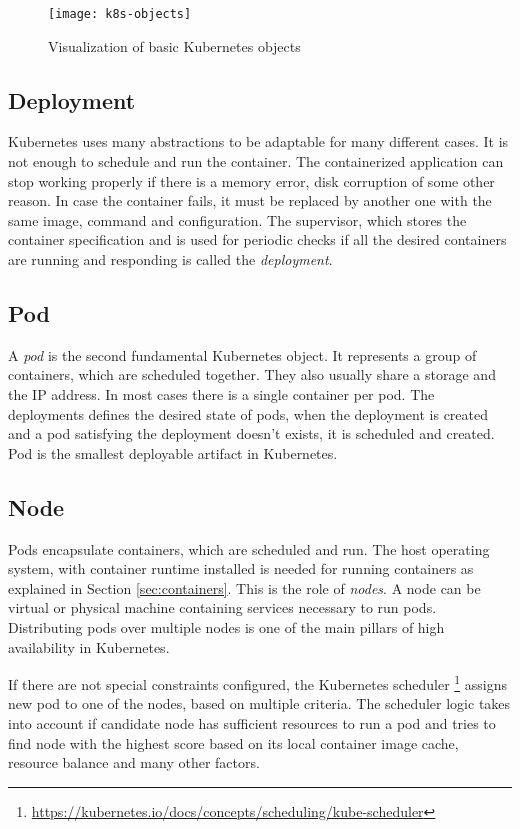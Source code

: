 \documentclass[
  digital, %
  twoside, %
  table,   %
  lof,     %
  lot,     %
]{fithesis3}
\begin{document}
\begin{figure}[H]
\caption{Visualization of basic Kubernetes objects}
\centering
\texttt{[image: k8s-objects]}
\label{fig:k8s_objects}
\end{figure}

\subsection{Deployment} \label{sec:deployment}
Kubernetes uses many abstractions to be adaptable for many different cases. It is not enough to schedule and run the container. The containerized application can stop working properly if there is a memory error, disk corruption of some other reason. In case the container fails, it must be replaced by another one with the same image, command and configuration. The supervisor, which stores the container specification and is used for periodic checks if all the desired containers are running and responding is called the \textit{deployment}.

\subsection{Pod} \label{sec:pod}
A \textit{pod} is the second fundamental Kubernetes object. It represents a group of containers, which are scheduled together. They also usually share a storage and the IP address. In most cases there is a single container per pod. The deployments defines the desired state of pods, when the deployment is created and a pod satisfying the deployment doesn't exists, it is scheduled and created. Pod is the smallest deployable artifact in Kubernetes.

\subsection{Node} \label{sec:node}
Pods encapsulate containers, which are scheduled and run. The host operating system, with container runtime installed is needed for running containers as explained in Section \ref{sec:containers}. This is the role of \textit{nodes}. A node can be virtual or physical machine containing services necessary to run pods. Distributing pods over multiple nodes is one of the main pillars of high availability in Kubernetes.

If there are not special constraints configured, the Kubernetes scheduler \footnote{\url{https://kubernetes.io/docs/concepts/scheduling/kube-scheduler}} assigns new pod to one of the nodes, based on multiple criteria. The scheduler logic takes into account if candidate node has sufficient resources to run a pod and tries to find node with the highest score based on its local container image cache, resource balance and many other factors.
\end{document}
